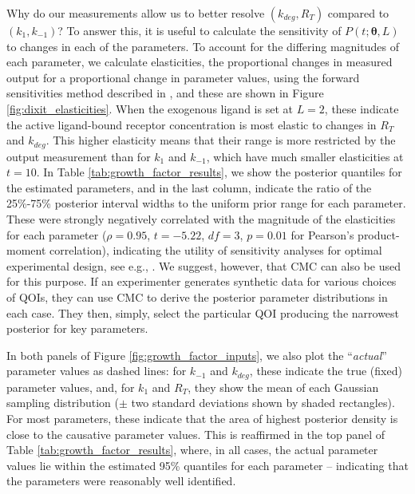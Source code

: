Why do our measurements allow us to better resolve $(k_{deg},R_T)$ compared to $(k_1,k_{-1})$? To answer this, it is useful to calculate the sensitivity of $P(t; \boldsymbol{\theta}, L)$ to changes in each of the parameters. To account for the differing magnitudes of each parameter, we calculate elasticities, the proportional changes in measured output for a proportional change in parameter values, using the forward sensitivities method described in \cite{DGCT2018}, and these are shown in Figure \ref{fig:dixit_elasticities}. When the exogenous ligand is set at $L=2$, these indicate the active ligand-bound receptor concentration is most elastic to changes in $R_T$ and $k_{deg}$. This higher elasticity means that their range is more restricted by the output measurement than for $k_1$ and $k_{-1}$, which have much smaller elasticities at $t=10$. In Table \ref{tab:growth_factor_results}, we show the posterior quantiles for the estimated parameters, and in the last column, indicate the ratio of the 25\%-75\% posterior interval widths to the uniform prior range for each parameter. These were strongly negatively correlated with the magnitude of the elasticities for each parameter ($\rho=0.95$, $t=-5.22$, $df=3$, $p=0.01$ for Pearson's product-moment correlation), indicating the utility of sensitivity analyses for optimal experimental design, see e.g., \cite{Banks2011}. We suggest, however, that CMC can also be used for this purpose. If an experimenter generates synthetic data for various choices of QOIs, they can use CMC to derive the posterior parameter distributions in each case. They then, simply, select the particular QOI producing the narrowest posterior for key parameters.

In both panels of Figure \ref{fig:growth_factor_inputs}, we also plot the ``\textit{actual}'' parameter values as dashed lines: for $k_{-1}$ and $k_{deg}$, these indicate the true (fixed) parameter values, and, for $k_1$ and $R_T$, they show the mean of each Gaussian sampling distribution ($\pm$ two standard deviations shown by shaded rectangles). For most parameters, these indicate that the area of highest posterior density is close to the causative parameter values. This is reaffirmed in the top panel of Table \ref{tab:growth_factor_results}, where, in all cases, the actual parameter values lie within the estimated 95\% quantiles for each parameter -- indicating that the parameters were reasonably well identified.


